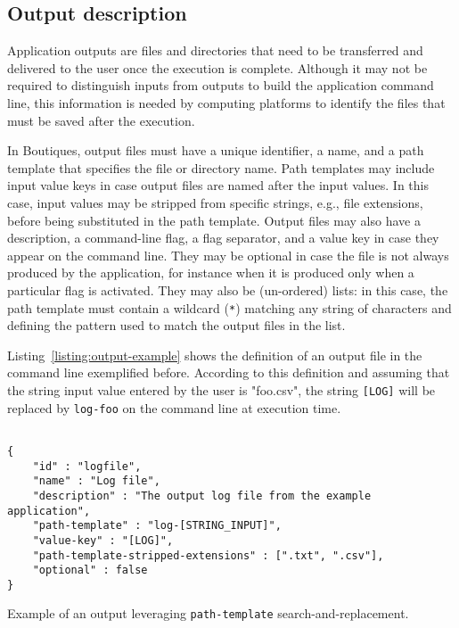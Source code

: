 \documentclass{article}
\newcommand{\boutiques}{Boutiques\xspace}
\begin{document}
\subsection{Output description}

Application outputs are files and directories that need to be
transferred and delivered to the user once the execution is
complete. Although it may not be required to distinguish inputs from
outputs to build the application command line, this information is
needed by computing platforms to identify the files that must be saved
after the execution.

In \boutiques, output files must have a unique identifier, a name, and
a path template that specifies the file or directory name. Path
templates may include input value keys in case output files are named
after the input values. In this case, input values may be stripped
from specific strings, e.g., file extensions, before being substituted
in the path template. Output files may also have a description, a
command-line flag, a flag separator, and a value key in case they
appear on the command line. They may be optional in case the file is
not always produced by the application, for instance when it is
produced only when a particular flag is activated. They may also be
(un-ordered) lists: in this case, the path template must contain a
wildcard (\texttt{*}) matching any string of characters and defining
the pattern used to match the output files in the list.

Listing~\ref{listing:output-example} shows the definition of an output
file in the command line exemplified before. According to this
definition and assuming that the string input value entered by the
user is "foo.csv", the string \texttt{[LOG]} will be
replaced by \texttt{log-foo} on the command line at execution time.

\begin{listing}
\begin{verbatim}

{
    "id" : "logfile",
    "name" : "Log file",
    "description" : "The output log file from the example application",
    "path-template" : "log-[STRING_INPUT]",
    "value-key" : "[LOG]",
    "path-template-stripped-extensions" : [".txt", ".csv"],
    "optional" : false
}
\end{verbatim}
\caption{Example of an output leveraging \texttt{path-template} search-and-replacement.} 
\label{listing:output-example}
\end{listing}
\end{document}
